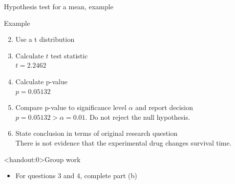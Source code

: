 \documentclass[xcolor=table, handout]{beamer}
\begin{document}
\begin{frame}{Hypothesis test for a mean, example}
\begin{exampleblock}{Example}
\large
\begin{enumerate}
\setcounter{enumi}{1}

\item Use a t distribution
\pause\item Calculate $t$ test statistic\\
\pause$t=2.2462$
\pause\item Calculate p-value\\
\pause$p = 0.05132$
\pause\item Compare p-value to significance level $\alpha$ and report decision\\
\pause$p = 0.05132 > \alpha = 0.01$. Do not reject the null hypothesis.
\pause\item State conclusion in terms of original research question\\
\pause There is not evidence that the experimental drug changes survival time.
\end{enumerate}

\end{exampleblock}
\end{frame}

\begin{frame}<handout:0>{Group work}
\begin{block}{}
\large
\begin{itemize}
\item For questions 3 and 4, complete part (b)
\end{itemize}
\end{block}
\end{frame}
\end{document}
